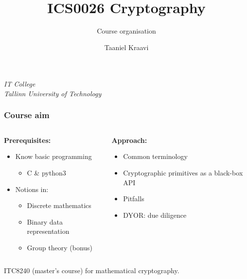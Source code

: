 
\usepackage{graphicx}

\usepackage{csquotes}

\usepackage[en-GB]{datetime2}

\title{ICS0026 Cryptography}
\subtitle{Course organisation}
\date{}
\author{Taaniel Kraavi}
\institute%
{%
  \textit{IT College}\\
  \textit{Tallinn University of Technology}
}


\begin{frame}
  \titlepage
\end{frame}

\begin{frame}
  \frametitle{Course aim}

  \begin{columns}[T]
    \begin{column}{.5\textwidth}
      \textbf{Prerequisites:}
      \begin{itemize}[<+->]
        \pause
        \item Know basic programming
        \begin{itemize}
          \item C \& python3
        \end{itemize}
        \item Notions in:
        \begin{itemize}
          \item Discrete mathematics
          \item Binary data representation
          \item Group theory (bonus)
        \end{itemize}
      \end{itemize}
    \end{column}

    \pause
    \begin{column}{.4\textwidth}
      \textbf{Approach:}
      \begin{itemize}[<+->]
        \item Common terminology
        \item Cryptographic primitives as a black-box API
        \item Pitfalls
        \item DYOR: due diligence
      \end{itemize}
    \end{column}
  \end{columns}

  \vspace*{2em}

  \pause
  ITC8240 (master's course) for mathematical cryptography.
\end{frame}


